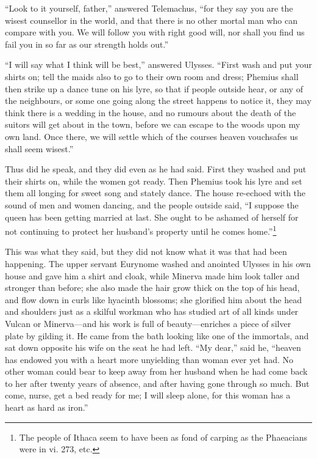 “Look to it yourself, father,” answered Telemachus, “for they say you are the
wisest counsellor in the world, and that there is no other mortal man who can
compare with you. We will follow you with right good will, nor shall you find
us fail you in so far as our strength holds out.”

“I will say what I think will be best,” answered Ulysses. “First wash and put
your shirts on; tell the maids also to go to their own room and dress; Phemius
shall then strike up a dance tune on his lyre, so that if people outside hear,
or any of the neighbours, or some one going along the street happens to notice
it, they may think there is a wedding in the house, and no rumours about the
death of the suitors will get about in the town, before we can escape to the
woods upon my own land. Once there, we will settle which of the courses heaven
vouchsafes us shall seem wisest.”

Thus did he speak, and they did even as he had said. First they washed and put
their shirts on, while the women got ready. Then Phemius took his lyre and set
them all longing for sweet song and stately dance. The house re-echoed with the
sound of men and women dancing, and the people outside said, “I suppose the
queen has been getting married at last. She ought to be ashamed of herself for
not continuing to protect her husband’s property until he comes home.”\footnote{The people of Ithaca seem to have been as fond of carping as the Phaeacians
were in vi. 273, etc.}

This was what they said, but they did not know what it was that had been
happening. The upper servant Eurynome washed and anointed Ulysses in his own
house and gave him a shirt and cloak, while Minerva made him look taller and
stronger than before; she also made the hair grow thick on the top of his head,
and flow down in curls like hyacinth blossoms; she glorified him about the head
and shoulders just as a skilful workman who has studied art of all kinds under
Vulcan or Minerva—and his work is full of beauty—enriches a piece of silver
plate by gilding it. He came from the bath looking like one of the immortals,
and sat down opposite his wife on the seat he had left. “My dear,” said he,
“heaven has endowed you with a heart more unyielding than woman ever yet had.
No other woman could bear to keep away from her husband when he had come back
to her after twenty years of absence, and after having gone through so much.
But come, nurse, get a bed ready for me; I will sleep alone, for this woman has
a heart as hard as iron.”

